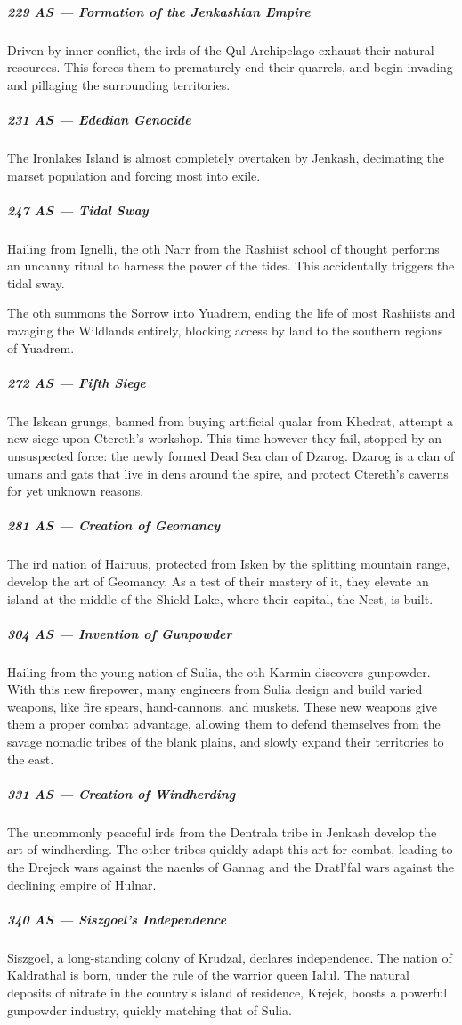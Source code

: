 \subparagraph{229 AS --- Formation of the Jenkashian Empire} Driven by inner conflict, the irds of the Qul Archipelago exhaust their natural resources.
This forces them to prematurely end their quarrels, and begin invading and pillaging the surrounding territories.

\subparagraph{231 AS --- Ededian Genocide} The Ironlakes Island is almost completely overtaken by Jenkash, decimating the marset population and forcing most into exile.

\subparagraph{247 AS --- Tidal Sway} Hailing from Ignelli, the oth Narr from the Rashiist school of thought performs an uncanny ritual to harness the power of the tides.
This accidentally triggers the tidal sway.

The oth summons the Sorrow into Yuadrem, ending the life of most Rashiists and ravaging the Wildlands entirely, blocking access by land to the southern regions of Yuadrem.

\subparagraph{272 AS --- Fifth Siege} The Iskean grungs, banned from buying artificial qualar from Khedrat, attempt a new siege upon Ctereth's workshop.
This time however they fail, stopped by an unsuspected force: the newly formed Dead Sea clan of Dzarog.
Dzarog is a clan of umans and gats that live in dens around the spire, and protect Ctereth's caverns for yet unknown reasons.

\subparagraph{281 AS --- Creation of Geomancy} The ird nation of Hairuus, protected from Isken by the splitting mountain range, develop the art of Geomancy.
As a test of their mastery of it, they elevate an island at the middle of the Shield Lake, where their capital, the Nest, is built.

\subparagraph{304 AS --- Invention of Gunpowder} Hailing from the young nation of Sulia, the oth Karmin discovers gunpowder.
With this new firepower, many engineers from Sulia design and build varied weapons, like fire spears, hand-cannons, and muskets.
These new weapons give them a proper combat advantage, allowing them to defend themselves from the savage nomadic tribes of the blank plains, and slowly expand their territories to the east.

\subparagraph{331 AS --- Creation of Windherding} The uncommonly peaceful irds from the Dentrala tribe in Jenkash develop the art of windherding.
The other tribes quickly adapt this art for combat, leading to the Drejeck wars against the naenks of Gannag and the Dratl'fal wars against the declining empire of Hulnar.

\subparagraph{340 AS --- Siszgoel's Independence} Siszgoel, a long-standing colony of Krudzal, declares independence.
The nation of Kaldrathal is born, under the rule of the warrior queen Ialul.
The natural deposits of nitrate in the country's island of residence, Krejek, boosts a powerful gunpowder industry, quickly matching that of Sulia.

